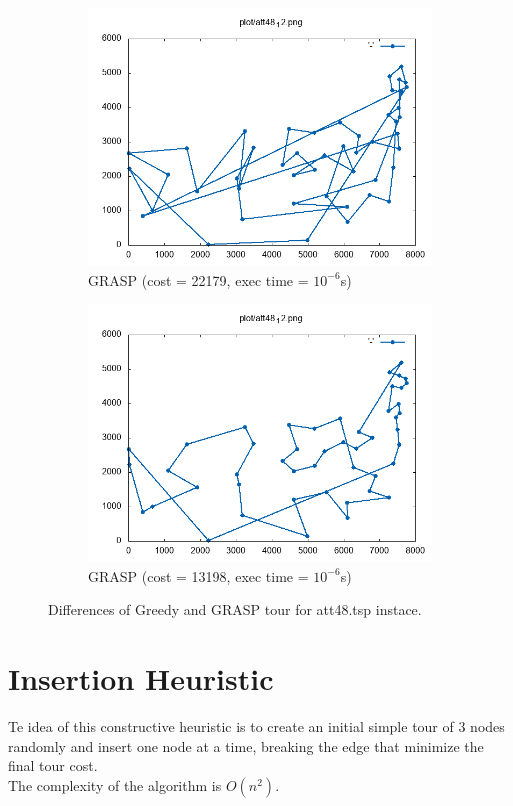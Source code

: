 \begin{figure}[!h]
\begin{subfigure}{.5\textwidth}
	\centering
	\includegraphics[width=\columnwidth]{../res/att48_12_3.png}
	\caption{GRASP (cost = 22179, exec time = $ 10^{-6} $s)}
	\label{fig:att48_GRASP3}
	\end{subfigure}
	\begin{subfigure}{.5\textwidth}
	\centering
	\includegraphics[width=\columnwidth]{../res/att48_12_4.png}
	\caption{GRASP (cost = 13198, exec time = $ 10^{-6} $s)}
	\label{fig:att48_GRASP4}
	\end{subfigure}
	\caption{Differences of Greedy and GRASP tour for att48.tsp instace.}
	\label{fig:att48_diff}
\end{figure}


\section{Insertion Heuristic}
Te idea of this constructive heuristic is to create an initial simple tour of 3 nodes randomly and insert one node at a time, breaking the edge that minimize the final tour cost.\\
The complexity of the algorithm is $ O(n^2) $.


